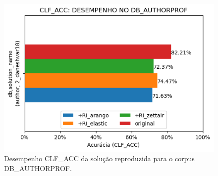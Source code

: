\begin{figure}[h]
    \centering
    \caption{Desempenho CLF\_ACC da solução reproduzida para o corpus DB\_AUTHORPROF.}
    \vspace{-0.0cm}
    \begin{center}
        \includegraphics[width=1.0\textwidth]{img/clf-acc-bars-authorprof.png}
    \end{center}
    \vspace{-0.0cm}
    \label{fig:clf-acc-bars-authorprof}
\end{figure}